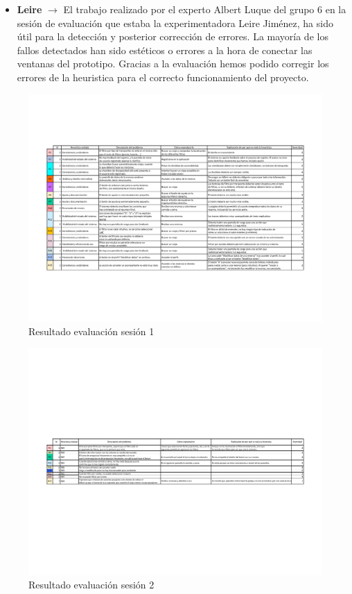 \begin{itemize}
    \item \textbf{Leire} $\rightarrow$ El trabajo realizado por el experto Albert Luque del grupo 6 en la sesión de evaluación que estaba la experimentadora Leire Jiménez, ha sido útil para la detección y posterior corrección de errores. La mayoría de los fallos detectados han sido estéticos o errores a la hora de conectar las ventanas del prototipo. Gracias a la evaluación hemos podido corregir los errores de la heuristica para el correcto funcionamiento del proyecto.
\end{itemize}
\newpage
\begin{figure}[H]
    \centering
    \includegraphics[angle=270,width=1.\textwidth]{Imagenes/Hito6/Evaluación Sesión 1.pdf}
    \caption{Resultado evaluación sesión 1}
    \label{fig:eva-s1}
\end{figure}

\begin{figure}[H]
    \centering
    \includegraphics[angle=270,width=1.\textwidth]{Imagenes/Hito6/Evaluación Sesión 2.pdf}
    \caption{Resultado evaluación sesión 2}
    \label{fig:eva-s2}
\end{figure}

